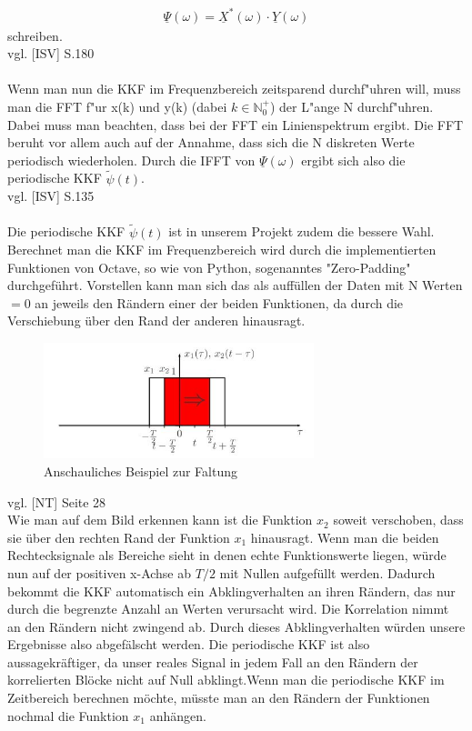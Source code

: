 \begin{align}
\boxed{\underline \Psi(\omega) = \underline{X}^*(\omega) \cdot \underline{Y}(\omega)}
\end{align}
schreiben.
\\vgl. [ISV] S.180
\\\\
Wenn man nun die KKF im Frequenzbereich zeitsparend durchf"uhren will, muss man die FFT f"ur x(k) und y(k) (dabei $k \in \mathbb{N}^+_0$) der L"ange N durchf"uhren. Dabei muss man beachten, dass bei der FFT ein Linienspektrum ergibt. Die FFT beruht vor allem auch auf der Annahme, dass sich die N diskreten Werte periodisch wiederholen. Durch die IFFT von $ \underline \Psi(\omega)$ ergibt sich also die periodische KKF $\tilde{\psi}(t)$.\\vgl. [ISV] S.135\\\\Die periodische KKF $\tilde{\psi}(t)$ ist in unserem Projekt zudem die bessere Wahl. Berechnet man die KKF im Frequenzbereich wird durch die implementierten Funktionen von Octave, so wie von Python, sogenanntes "Zero-Padding" durchgeführt. Vorstellen kann man sich das als auffüllen der Daten mit N Werten $=0$ an jeweils den Rändern einer der beiden Funktionen, da durch die Verschiebung über den Rand der anderen hinausragt.

\begin{figure}[h] 
  \centering
     \includegraphics[width=0.7\textwidth]{Faltung.jpg}
  \caption{Anschauliches Beispiel zur Faltung}
  \label{fig:Bild1}
\end{figure}
vgl. [NT] Seite 28\\
Wie man auf dem Bild erkennen kann ist die Funktion $x_2$ soweit verschoben, dass sie über den rechten Rand der Funktion $x_1$ hinausragt. Wenn man die beiden Rechtecksignale als Bereiche sieht in denen echte Funktionswerte liegen, würde nun auf der positiven x-Achse ab $T/2$ mit Nullen aufgefüllt werden. Dadurch bekommt die KKF automatisch ein Abklingverhalten an ihren Rändern, das nur durch die begrenzte Anzahl an Werten verursacht wird. Die Korrelation nimmt an den Rändern nicht zwingend ab. Durch dieses Abklingverhalten würden unsere Ergebnisse also abgefälscht werden. Die periodische KKF ist also aussagekräftiger, da unser reales Signal in jedem Fall an den Rändern der korrelierten Blöcke nicht auf Null abklingt.Wenn man die periodische KKF im Zeitbereich berechnen möchte, müsste man an den Rändern der Funktionen nochmal die Funktion $x_1$ anhängen.